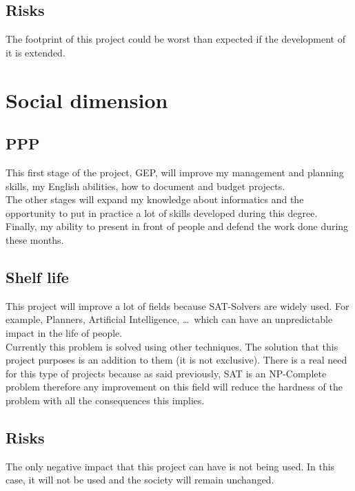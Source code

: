 \subsection{Risks} 
The footprint of this project could be worst than expected if the development of it is extended.

\section{Social dimension}
\subsection{PPP}
This first stage of the project, GEP, will improve my management and planning skills, my English abilities, how to document and budget projects.\\
The other stages will expand my knowledge about informatics and the opportunity to put in practice a lot of skills developed during this degree. \\
Finally, my ability to present in front of people and defend the work done during these months.

\subsection{Shelf life}
This project will improve a lot of fields because SAT-Solvers are widely used. For example, Planners, Artificial Intelligence, \ldots \ which can have an unpredictable impact in the life of people.\\

Currently this problem is solved using other techniques. The solution that this project purposes is an addition to them (it is not exclusive). There is a real need for this type of projects because as said previously, SAT is an NP-Complete problem therefore any improvement on this field will reduce the hardness of the problem with all the consequences this implies.
\subsection{Risks}
The only negative impact that this project can have is not being used. In this case, it will not be used and the society will remain unchanged.

